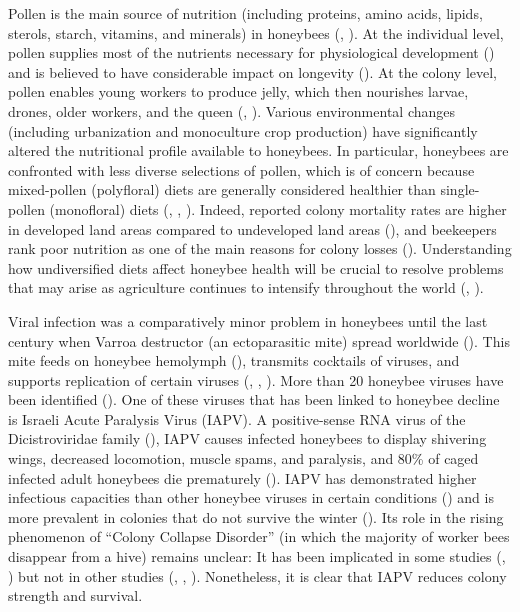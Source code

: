 \documentclass[11pt,a4paper,oldfontcommands,openany]{memoir}
\numberwithin{equation}{section} %
\begin{document}
Pollen is the main source of nutrition (including proteins, amino acids, lipids, sterols, starch, vitamins, and minerals) in honeybees (\citealt{source}, \citealt{source2}). At the individual level, pollen supplies most of the nutrients necessary for physiological development (\citealt{brodschneider}) and is believed to have considerable impact on longevity (\citealt{longevity}). At the colony level, pollen enables young workers to produce jelly, which then nourishes larvae, drones, older workers, and the queen (\citealt{jelly}, \citealt{jelly2}). Various environmental changes (including urbanization and monoculture crop production) have significantly altered the nutritional profile available to honeybees. In particular, honeybees are confronted with less diverse selections of pollen, which is of concern because mixed-pollen (polyfloral) diets are generally considered healthier than single-pollen (monofloral) diets (\citealt{diverse}, \citealt{diverse2}, \citealt{alaux}). Indeed, reported colony mortality rates are higher in developed land areas compared to undeveloped land areas (\citealt{undeveloped}), and beekeepers rank poor nutrition as one of the main reasons for colony losses (\citealt{bkLoss}). Understanding how undiversified diets affect honeybee health will be crucial to resolve problems that may arise as agriculture continues to intensify throughout the world (\citealt{ag}, \citealt{ag2}).

Viral infection was a comparatively minor problem in honeybees until the last century when Varroa destructor (an ectoparasitic mite) spread worldwide (\citealt{miteSpread}). This mite feeds on honeybee hemolymph (\citealt{hemolymph}), transmits cocktails of viruses, and supports replication of certain viruses (\citealt{miteVirus}, \citealt{miteVirus2}, \citealt{miteVirus3}). More than 20 honeybee viruses have been identified (\citealt{numVirus}). One of these viruses that has been linked to honeybee decline is Israeli Acute Paralysis Virus (IAPV). A positive-sense RNA virus of the Dicistroviridae family (\citealt{fam}), IAPV causes infected honeybees to display shivering wings, decreased locomotion, muscle spams, and paralysis, and 80\% of caged infected adult honeybees die prematurely (\citealt{symptoms}). IAPV has demonstrated higher infectious capacities than other honeybee viruses in certain conditions (\citealt{carrillo}) and is more prevalent in colonies that do not survive the winter (\citealt{winter}). Its role in the rising phenomenon of ``Colony Collapse Disorder'' (in which the majority of worker bees disappear from a hive) remains unclear: It has been implicated in some studies (\citealt{iapvCCD}, \citealt{iapvCCD2}) but not in other studies (\citealt{ccd1}, \citealt{iapvCCD3}, \citealt{fam}). Nonetheless, it is clear that IAPV reduces colony strength and survival.
\end{document}
